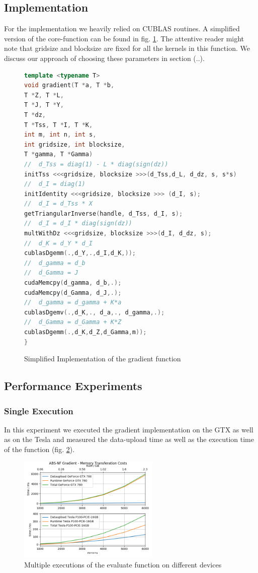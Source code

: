 \subsection{Implementation}

For the implementation we heavily relied on CUBLAS routines. 
A simplified version of the core-function can be found in fig. \ref{fig_lst_grad}. The attentive reader might note that gridsize and blocksize are fixed for all the kernels in this function. We discuss our approach of choosing these parameters in section (..).

\begin{figure}
\begin{lstlisting}[language=cpp]
template <typename T>
void gradient(T *a, T *b, 
T *Z, T *L, 
T *J, T *Y,
T *dz,
T *Tss, T *I, T *K,
int m, int n, int s,
int gridsize, int blocksize,
T *gamma, T *Gamma)
//  d_Tss = diag(1) - L * diag(sign(dz))
initTss <<<gridsize, blocksize >>>(d_Tss,d_L, d_dz, s, s*s);
//  d_I = diag(1)
initIdentity <<<gridsize, blocksize >>> (d_I, s);
//  d_I = d_Tss * X	
getTriangularInverse(handle, d_Tss, d_I, s);
//	d_I = d_I * diag(sign(dz))
multWithDz <<<gridsize, blocksize >>>(d_I, d_dz, s);
//	d_K = d_Y * d_I
cublasDgemm(.,d_Y,.,d_I,d_K,));
//	d_gamma = d_b
//  d_Gamma = J
cudaMemcpy(d_gamma, d_b,.);
cudaMemcpy(d_Gamma, d_J,.);
//	d_gamma = d_gamma + K*a
cublasDgemv(.,d_K,., d_a,., d_gamma,.);
//  d_Gamma = d_Gamma + K*Z
cublasDgemm(.,d_K,d_Z,d_Gamma,m));
}
\end{lstlisting}
\label{fig_lst_grad}
\caption{Simplified Implementation of the gradient function}
\end{figure}

\subsection{Performance Experiments}
\subsubsection{Single Execution}
In this experiment we executed the gradient implementation on the GTX as well as on the Tesla and measured the data-upload time as well as the execution time of the function (fig. \ref{fig_grad_memory}).
\begin{figure}[ht]
	\centering
	\includegraphics[width=0.6\textwidth]{img/gradient_memory.png}
	\caption{Multiple executions of the evaluate function on different devices}
	\label{fig_grad_memory}
\end{figure}
